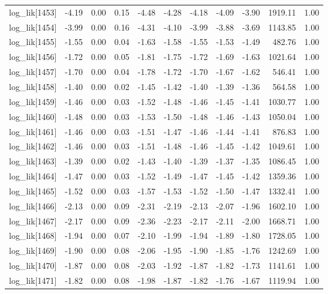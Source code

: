 \begin{table}[ht]
\begin{tabular}{rrrrrrrrrrr}
  log\_lik[1453] & -4.19 & 0.00 & 0.15 & -4.48 & -4.28 & -4.18 & -4.09 & -3.90 & 1919.11 & 1.00 \\ 
  log\_lik[1454] & -3.99 & 0.00 & 0.16 & -4.31 & -4.10 & -3.99 & -3.88 & -3.69 & 1143.85 & 1.00 \\ 
  log\_lik[1455] & -1.55 & 0.00 & 0.04 & -1.63 & -1.58 & -1.55 & -1.53 & -1.49 & 482.76 & 1.00 \\ 
  log\_lik[1456] & -1.72 & 0.00 & 0.05 & -1.81 & -1.75 & -1.72 & -1.69 & -1.63 & 1021.64 & 1.00 \\ 
  log\_lik[1457] & -1.70 & 0.00 & 0.04 & -1.78 & -1.72 & -1.70 & -1.67 & -1.62 & 546.41 & 1.00 \\ 
  log\_lik[1458] & -1.40 & 0.00 & 0.02 & -1.45 & -1.42 & -1.40 & -1.39 & -1.36 & 564.58 & 1.00 \\ 
  log\_lik[1459] & -1.46 & 0.00 & 0.03 & -1.52 & -1.48 & -1.46 & -1.45 & -1.41 & 1030.77 & 1.00 \\ 
  log\_lik[1460] & -1.48 & 0.00 & 0.03 & -1.53 & -1.50 & -1.48 & -1.46 & -1.43 & 1050.04 & 1.00 \\ 
  log\_lik[1461] & -1.46 & 0.00 & 0.03 & -1.51 & -1.47 & -1.46 & -1.44 & -1.41 & 876.83 & 1.00 \\ 
  log\_lik[1462] & -1.46 & 0.00 & 0.03 & -1.51 & -1.48 & -1.46 & -1.45 & -1.42 & 1049.61 & 1.00 \\ 
  log\_lik[1463] & -1.39 & 0.00 & 0.02 & -1.43 & -1.40 & -1.39 & -1.37 & -1.35 & 1086.45 & 1.00 \\ 
  log\_lik[1464] & -1.47 & 0.00 & 0.03 & -1.52 & -1.49 & -1.47 & -1.45 & -1.42 & 1359.36 & 1.00 \\ 
  log\_lik[1465] & -1.52 & 0.00 & 0.03 & -1.57 & -1.53 & -1.52 & -1.50 & -1.47 & 1332.41 & 1.00 \\ 
  log\_lik[1466] & -2.13 & 0.00 & 0.09 & -2.31 & -2.19 & -2.13 & -2.07 & -1.96 & 1602.10 & 1.00 \\ 
  log\_lik[1467] & -2.17 & 0.00 & 0.09 & -2.36 & -2.23 & -2.17 & -2.11 & -2.00 & 1668.71 & 1.00 \\ 
  log\_lik[1468] & -1.94 & 0.00 & 0.07 & -2.10 & -1.99 & -1.94 & -1.89 & -1.80 & 1728.05 & 1.00 \\ 
  log\_lik[1469] & -1.90 & 0.00 & 0.08 & -2.06 & -1.95 & -1.90 & -1.85 & -1.76 & 1242.69 & 1.00 \\ 
  log\_lik[1470] & -1.87 & 0.00 & 0.08 & -2.03 & -1.92 & -1.87 & -1.82 & -1.73 & 1141.61 & 1.00 \\ 
  log\_lik[1471] & -1.82 & 0.00 & 0.08 & -1.98 & -1.87 & -1.82 & -1.76 & -1.67 & 1119.94 & 1.00 \\ 

\end{tabular}
\end{table}
